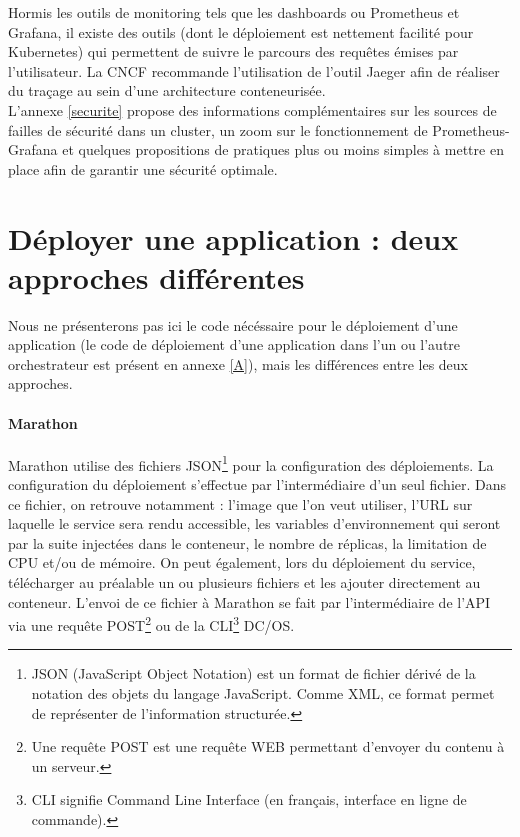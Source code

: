 \documentclass[11pt,fleqn]{book} %
\begin{document}
Hormis les outils de monitoring tels que les dashboards ou Prometheus et Grafana, il existe des outils (dont le déploiement est nettement facilité pour Kubernetes) qui permettent de suivre le parcours des requêtes émises par l’utilisateur. La CNCF recommande l’utilisation de l’outil Jaeger afin de réaliser du traçage au sein d’une architecture conteneurisée.\\

L'annexe \ref{securite} propose des informations complémentaires sur les sources de failles de sécurité dans un cluster, un zoom sur le fonctionnement de Prometheus-Grafana et quelques propositions de pratiques plus ou moins simples à mettre en place afin de garantir une sécurité optimale. 

\section{Déployer une application : deux approches différentes}
Nous ne présenterons pas ici le code nécéssaire pour le déploiement d'une application (le code de déploiement d'une application dans l'un ou l'autre orchestrateur est présent en annexe \ref{A}), mais les différences entre les deux approches.
\paragraph{Marathon}
 Marathon utilise des fichiers JSON\footnote{JSON (JavaScript Object Notation) est un format de fichier dérivé de la notation des objets du langage JavaScript. Comme XML, ce format permet de représenter de l’information structurée.} pour la configuration des déploiements. La configuration du déploiement s'effectue par l'intermédiaire d'un seul fichier. Dans ce fichier, on retrouve notamment : l'image que l'on veut utiliser, l'URL sur laquelle le service sera rendu accessible, les variables d'environnement qui seront par la suite injectées dans le conteneur, le nombre de réplicas, la limitation de CPU et/ou de mémoire. On peut également, lors du déploiement du service, télécharger au préalable un ou plusieurs fichiers et les ajouter directement au conteneur.  L'envoi de ce fichier à Marathon se fait par l'intermédiaire de l'API via une requête POST\footnote{Une requête POST est une requête WEB permettant d'envoyer du contenu à un serveur.} ou de la CLI\footnote{CLI signifie Command Line Interface (en français, interface en ligne de commande).} DC/OS.
 
\end{document}
